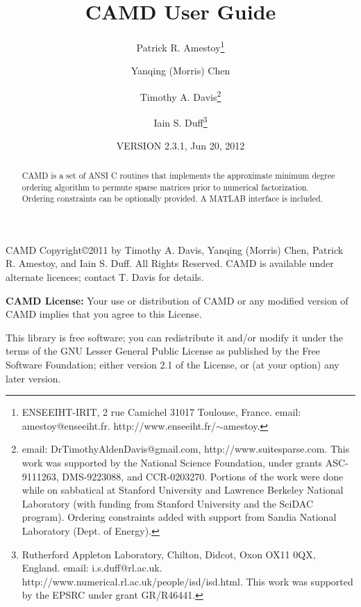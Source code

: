 \documentclass[11pt]{article}
\begin{document}

\title{CAMD User Guide}
\author{Patrick R. Amestoy\thanks{ENSEEIHT-IRIT,
2 rue Camichel 31017 Toulouse, France.
email: amestoy@enseeiht.fr.  http://www.enseeiht.fr/$\sim$amestoy.}
\and Yanqing (Morris) Chen
\and Timothy A. Davis\thanks{
email: DrTimothyAldenDavis@gmail.com,
http://www.suitesparse.com.
This work was supported by the National
Science Foundation, under grants ASC-9111263, DMS-9223088, and CCR-0203270.
Portions of the work were done while on sabbatical at Stanford University
and Lawrence Berkeley National Laboratory (with funding from Stanford
University and the SciDAC program).  Ordering constraints added with
support from Sandia National Laboratory (Dept. of Energy).
}
\and Iain S. Duff\thanks{Rutherford Appleton Laboratory, Chilton, Didcot, 
Oxon OX11 0QX, England. email: i.s.duff@rl.ac.uk.  
http://www.numerical.rl.ac.uk/people/isd/isd.html.
This work was supported by the EPSRC under grant GR/R46441.
}}

\date{VERSION 2.3.1, Jun 20, 2012}
\maketitle

\begin{abstract}
CAMD is a set of ANSI C routines that implements the approximate minimum degree
ordering algorithm to permute sparse matrices prior to
numerical factorization.  Ordering constraints can be optionally provided.
A MATLAB interface is included.
\end{abstract}

CAMD Copyright\copyright 2011 by Timothy A.  Davis,
Yanqing (Morris) Chen,
Patrick R. Amestoy, and Iain S. Duff.  All Rights Reserved.
CAMD is available under alternate licences; contact T. Davis for details.

{\bf CAMD License:}
    Your use or distribution of CAMD or any modified version of
    CAMD implies that you agree to this License.

    This library is free software; you can redistribute it and/or
    modify it under the terms of the GNU Lesser General Public
    License as published by the Free Software Foundation; either
    version 2.1 of the License, or (at your option) any later version.
\end{document}
